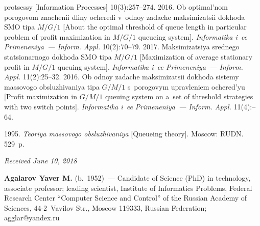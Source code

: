 \begin{multicols}{2}
{{\begin{thebibliography}{99}
{protsessy} [Information Processes] 10(3):257--274.
 2016. Ob optimal'nom 
porogovom znachenii  dliny ocheredi v~od\-noy zadache maksimizatsii dokhoda 
SMO tipa $M/G/1$ [About the optimal threshold of queue length in particular 
problem of profit maximization in $M/G/1$ queueing system]. 
\textit{Informatika i~ee 
Primeneniya~--- Inform. Appl.} 10(2):70--79.
 2017. Maksimizatsiya srednego sta\-tsi\-o\-nar\-no\-go dokhoda 
SMO tipa  $M/G/1$ [Maximization of average stationary profit in $M/G/1$ queuing 
system]. \textit{Informatika i~ee Primeneniya~--- Inform. Appl.} 
11(2):25--32. 
 2016. Ob odnoy zadache maksimizatsii 
dokhoda sistemy massovogo obsluzhivaniya tipa $G/M/1$ s~porogovym 
upravleniem ochered'yu [Profit maximization in $G/M/1$ queuing system on a~set 
of threshold strategies with two switch points]. \textit{Informatika i~ee Primeneniya~--- 
Inform. Appl.} 11(4):--64.
{ %

}
 1995. \textit{Teoriya massovogo obsluzhivaniya} 
[Queueing theory]. Moscow: RUDN. 529~p.
\end{thebibliography}

 }
 }

\end{multicols}

\vspace*{-6pt}

\hfill{\small\textit{Received June 10, 2018}}


  
  \Contrl
  
  \noindent
\textbf{Agalarov Yaver M.} (b.\ 1952)~--- Candidate of Science (PhD) in technology, associate 
professor; leading scientist, Institute of Informatics Problems, Federal Research Center ``Computer 
Science and Control'' of the Russian Academy of Sciences, 44-2~Vavilov Str., Moscow 119333, 
Russian Federation; \mbox{agglar@yandex.ru}
 
\label{end\stat}

\renewcommand{\bibname}{\protect\rm Литература}       